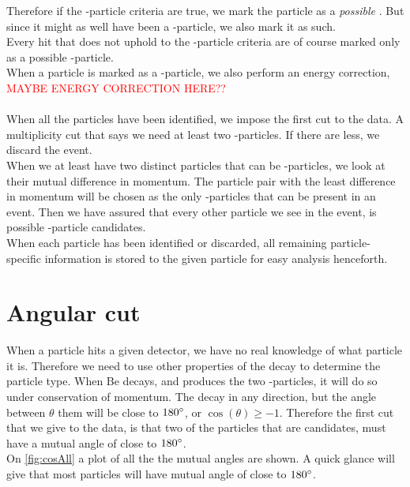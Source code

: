 Therefore if the \be-particle criteria are true, we mark the particle as a \textit{possible} \be. But since it might as well have been a \al-particle, we also mark it as such.\\
Every hit that does not uphold to the \be-particle criteria are of course marked only as a possible \al-particle.
\\
When a particle is marked as a \al-particle, we also perform an energy correction, \textcolor{red}{MAYBE ENERGY CORRECTION HERE??}
\\
\\
When all the particles have been identified, we impose the first cut to the data. A multiplicity cut that says we need at least two \al-particles. If there are less, we discard the event. 
\\
When we at least have two distinct particles that can be \al-particles, we look at their mutual difference in momentum. The particle pair with the least difference in momentum will be chosen as the only \al-particles that can be present in an event. Then we have assured that every other particle we see in the event, is possible \be-particle candidates. 
\\
When each particle has been identified or discarded, all remaining particle-specific information is stored to the given particle for easy analysis henceforth.





\section{Angular cut}
When a particle hits a given detector, we have no real knowledge of what particle it is. 
Therefore we need to use other properties of the decay to determine the particle type. 
When \isotope[8][]Be decays, and produces the two \al-particles, it will do so under conservation of momentum. The decay in any direction, but the angle between $\theta$ them will be close to  $180\degree$, or $\cos(\theta) \geq -1$. Therefore the first cut that we give to the data, is that two of the particles that are \al candidates, must have a mutual angle of close to $180\degree$.\\


On \cref{fig:cosAll} a plot of all the the mutual angles are shown. A quick glance will give that most particles will have mutual angle of close to $180\degree$. 

